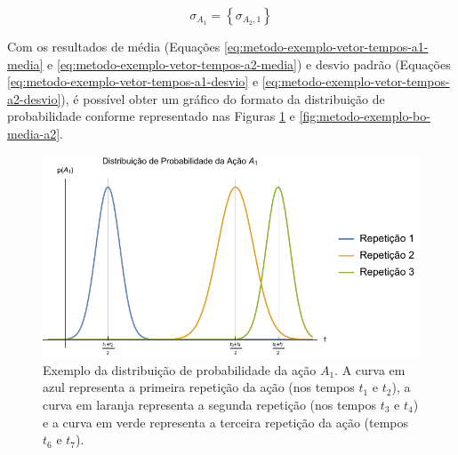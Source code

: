 \begin{equation}
    \sigma_{A_1} = \left\{
		\sigma_{{A_2},1}
	\right\}
	\label{eq:metodo-exemplo-vetor-tempos-a2-desvio}
\end{equation}

Com os resultados de média (Equações \ref{eq:metodo-exemplo-vetor-tempos-a1-media} e \ref{eq:metodo-exemplo-vetor-tempos-a2-media}) e desvio padrão (Equações \ref{eq:metodo-exemplo-vetor-tempos-a1-desvio} e \ref{eq:metodo-exemplo-vetor-tempos-a2-desvio}), é possível obter um gráfico do formato da distribuição de probabilidade conforme representado nas Figuras \ref{fig:metodo-exemplo-bo-media-a1} e \ref{fig:metodo-exemplo-bo-media-a2}.

\begin{figure}[htb]
	\caption{\label{fig:metodo-exemplo-bo-media-a1} Exemplo da distribuição de probabilidade da ação $A_1$. A curva em azul representa a primeira repetição da ação (nos tempos $t_1$ e $t_2$), a curva em laranja representa a segunda repetição (nos tempos $t_3$ e $t_4$) e a curva em verde representa a terceira repetição da ação (tempos $t_6$ e $t_7$).}
	\begin{center}
	    \includegraphics[width=\linewidth]{../Mathematica/Images/Exemplo_BO_Media_A1.pdf}
	\end{center}
\end{figure}

